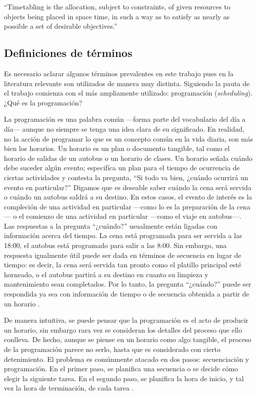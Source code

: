 \documentclass[draft,12pt,headsepline,footsepline,paper=letter]{scrreprt}
\begin{document}
“Timetabling is the allocation, subject to constraints, of given resources to objects being placed in space time, in such a way as to satisfy as nearly as possible a set of desirable objectives.”
\fi

\subsection{Definiciones de términos}

Es necesario aclarar algunos términos prevalentes en este trabajo pues en la literatura relevante son utilizados de manera muy distinta. Siguiendo la pauta de \citet[p.~46]{wren95scheduling-timetabling} el trabajo comienza con el más ampliamente utilizado: programación (\textit{scheduling}). ¿Qué es la programación?

La programación es una palabra común —forma parte del vocabulario del día a día— aunque no siempre se tenga una idea clara de su significado. En realidad, no la acción de programar lo que es un concepto común en la vida diaria, son más bien los horarios. Un horario es un plan o documento tangible, tal como el horario de salidas de un autobus o un horario de clases. Un horario señala cuándo debe suceder algún evento; especifíca un plan para el tiempo de ocurrencia de ciertas actividades y contesta la pregunta, “Si todo va bien, ¿cuándo ocurrirá un evento en particular?” 
Digamos que es deseable saber cuándo la cena será servida o cuándo un autobus saldrá a su destino. En estos casos, el evento de interés es la compleción de una actividad en particular —como lo es la preparación de la cena— o el comienzo de una actividad en particular —como el viaje en autobus—.
Las respuestas a la pregunta “¿cuándo?” usualmente están ligadas con información acerca del tiempo. La cena está programada para ser servida a las 18:00, el autobus está programado para salir a las 8:00. Sin embargo, una respuesta igualmente útil puede ser dada en términos de secuencia en lugar de tiempo: es decir, la cena será servida tan pronto como el platillo principal esté horneado, o el autobus partirá a su destino en cuanto su limpieza y mantenimiento sean completados. Por lo tanto, la pregunta “¿cuándo?” puede ser respondida ya sea con información de tiempo o de secuencia obtenida a partir de un horario \citep[p.~1]{Baker2009}.

De manera intuitiva, se puede pensar que la programación es el acto de producir un horario, sin embargo rara vez se consideran los detalles del proceso que ello conlleva. De hecho, aunque se piense en un horario como algo tangible, el proceso de la programación parece no serlo, hasta que es considerado con cierto detenimiento. El problema es comúnmente atacado en dos pasos: secuenciación y programación. En el primer paso, se planifica una secuencia o se decide cómo elegir la siguiente tarea. En el segundo paso, se planifica la hora de inicio, y tal vez la hora de terminación, de cada tarea \citep[p.~2]{Baker2009}. 
\end{document}
